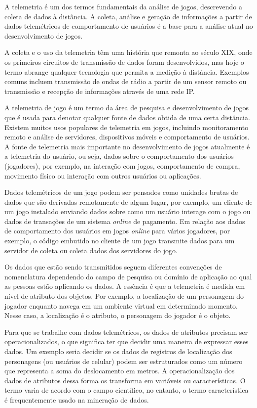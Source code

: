 A telemetria é um dos termos fundamentais da análise de jogos, descrevendo a coleta de dados à distância. A coleta, análise e geração de informações a partir de dados telemétricos de comportamento de usuários é a base para a análise atual no desenvolvimento de jogos.

A coleta e o uso da telemetria têm uma história que remonta ao século XIX, onde os primeiros circuitos de transmissão de dados foram desenvolvidos, mas hoje o termo abrange qualquer tecnologia que permita a medição à distância. Exemplos comuns incluem transmissão de ondas de rádio a partir de um sensor remoto ou transmissão e recepção de informações através de uma rede IP.

A telemetria de jogo é um termo da área de pesquisa e desenvolvimento de jogos que é usada para denotar qualquer fonte de dados obtida de uma certa distância. Existem muitos usos populares de telemetria em jogos, incluindo monitoramento remoto e análise de servidores, dispositivos móveis e comportamento de usuários. A fonte de telemetria mais importante no desenvolvimento de jogos atualmente é a telemetria do usuário, ou seja, dados sobre o comportamento dos usuários (jogadores), por exemplo, na interação com jogos, comportamento de compra, movimento físico ou interação com outros usuários ou aplicações.

Dados telemétricos de um jogo podem ser pensados como unidades brutas de dados que são derivadas remotamente de algum lugar, por exemplo, um cliente de um jogo instalado enviando dados sobre como um usuário interage com o jogo ou dados de transações de um sistema \textit{online} de pagamento. Em relação aos dados de comportamento dos usuários em jogos \textit{online} para vários jogadores, por exemplo, o código embutido no cliente de um jogo transmite dados para um servidor de coleta ou coleta dados dos servidores do jogo.

Os dados que estão sendo transmitidos seguem diferentes convenções de nomenclatura dependendo do campo de pesquisa ou domínio de aplicação ao qual as pessoas estão aplicando os dados. A essência é que a telemetria é medida em nível de atributo dos objetos. Por exemplo, a localização de um personagem do jogador enquanto navega em um ambiente virtual em determinado momento. Nesse caso, a localização é o atributo, o personagem do jogador é o objeto.

Para que se trabalhe com dados telemétricos, os dados de atributos precisam ser operacionalizados, o que significa ter que decidir uma maneira de expressar esses dados. Um exemplo seria decidir se os dados de registros de localização dos personagens (ou usuários de celular) podem ser estruturados como um número que representa a soma do deslocamento em metros. A operacionalização dos dados de atributos dessa forma os transforma em variáveis ou características. O termo varia de acordo com o campo científico, no entanto, o termo característica é frequentemente usado na mineração de dados.


